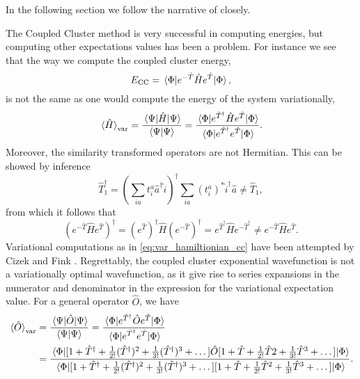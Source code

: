In the following section we follow the narrative of 
\citeauthor{kvaal2013variational} \cite{kvaal2013variational} closely.

The Coupled Cluster method is very successful in computing energies, but computing other 
expectations values has been a problem. For instance we see that the way we compute the
coupled cluster energy,
\begin{equation}
    E_{\text{CC}} = \mel{\Phi}{e^{-\hat{T}}\hat{H}e^{\hat{T}}}{\Phi},
\end{equation}
is not the same as one would compute the energy of the system variationally,
\begin{equation}
    \label{eq:var_hamiltionian_cc}
    \ev*{\hat{H}}_{\text{var}} = \frac{\mel{\Psi}{\hat{H}}{\Psi}}{\braket{\Psi}}
        = \frac{ \mel{\Phi}{e^{\hat{T}^\dagger} \hat{H} e^{\hat{T}}}{\Phi} }
            {\mel{\Phi}{e^{\hat{T}^\dagger} e^{\hat{T}}}{\Phi}}.
\end{equation}
Moreover, the similarity transformed operators are not Hermitian. This can be 
showed by inference
\begin{equation}
    \hat{T}^\dagger_1 = \left(\sum_{ia}t^a_i\hat{a}^\dagger \hat{i} \right)^\dagger 
        \sum_{ia} (t^a_i)^* \hat{i}^\dagger\hat{a} \neq \hat{T}_1,
\end{equation}
from which it follows that 
\begin{equation}
    \left(e^{-\hat{T}}\hat{H}e^{\hat{T}} \right)^\dagger
        = (e^{\hat{T}})^\dagger\hat{H}(e^{-\hat{T}})^\dagger
        = e^{\hat{T}^\dagger}\hat{H}e^{-\hat{T}^\dagger} 
        \neq e^{-\hat{T}}\hat{H}e^{\hat{T}}.
\end{equation}
Variational computations as in \autoref{eq:var_hamiltionian_cc} have been attempted 
by Cizek \cite{vcivzek1966correlation} and Fink \cite{fink1974new}.
Regrettably, the coupled cluster exponential 
wavefunction is not a variationally optimal wavefunction, as it give rise to
series expansions in the 
numerator and denominator in the expression for the variational expectation value. 
For a general operator $\hat{O}$, we have
\begin{equation}
    \begin{aligned}
        \label{eq:variational_exp_val_cc}
        \ev*{\hat{O}}_{\text{var}} &=\frac{ \mel{\Psi}{\hat{O}}{\Psi} }{\braket{\Psi}} 
            = \frac{ \mel{\Phi}{e^{\hat{T}^\dagger} \hat{O} e^{\hat{T}}}{\Phi} }
                {\mel{\Phi}{e^{\hat{T}^\dagger} e^{\hat{T}}}{\Phi}} \\
            &= \frac{
                \mel{\Phi}{
                [1 + \hat{T}^\dagger + \frac{1}{2!}(\hat{T}^\dagger)^2 + \frac{1}{3!}(\hat{T}^\dagger)^3 + \dots]
                \hat{O} 
                [1 + \hat{T}+ \frac{1}{2!}\hat{T}2 + \frac{1}{3!}\hat{T}^3 + \dots]
                }{\Phi}
                }{
                \mel
                {\Phi}
                {
                [1 + \hat{T}^\dagger + \frac{1}{2!}(\hat{T}^\dagger)^2 + \frac{1}{3!}(\hat{T}^\dagger)^3 + \dots]
                [1 + \hat{T} + \frac{1}{2!}\hat{T}^2 + \frac{1}{3!}\hat{T}^3 + \dots]
                } 
                {\Phi}
                }.
    \end{aligned}
\end{equation}
